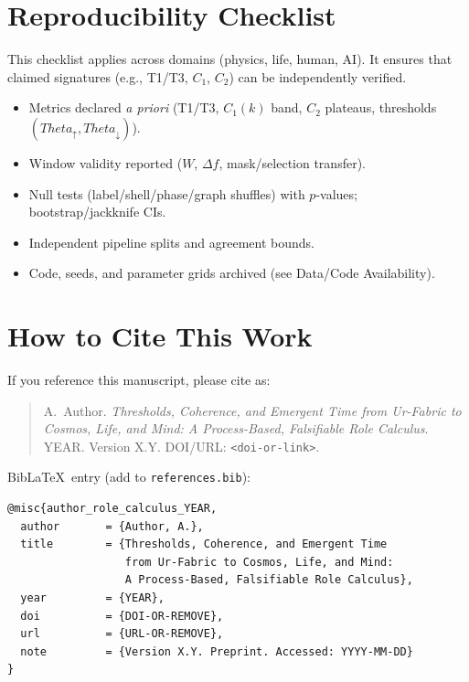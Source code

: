\documentclass[12pt,a4paper,oneside]{scrreprt}
\def\Theta{Theta}%
\begin{document}
\chapter*{Reproducibility Checklist}
This checklist applies across domains (physics, life, human, AI). 
It ensures that claimed signatures (e.g., T1/T3, $C_1$, $C_2$) can be independently verified.

\begin{itemize}
  \item Metrics declared \emph{a priori} (T1/T3, $C_1(k)$ band, $C_2$ plateaus, thresholds $(\Theta_\uparrow,\Theta_\downarrow)$).
  \item Window validity reported ($W$, $\Delta f$, mask/selection transfer).
  \item Null tests (label/shell/phase/graph shuffles) with $p$-values; bootstrap/jackknife CIs.
  \item Independent pipeline splits and agreement bounds.
  \item Code, seeds, and parameter grids archived (see Data/Code Availability).
\end{itemize}

\chapter*{How to Cite This Work}
If you reference this manuscript, please cite as:
\begin{quote}
A.~Author. \emph{Thresholds, Coherence, and Emergent Time from Ur-Fabric to Cosmos, Life, and Mind: A Process-Based, Falsifiable Role Calculus}. YEAR. 
Version X.Y. DOI/URL: \texttt{<doi-or-link>}.
\end{quote}

\noindent Bib\LaTeX\ entry (add to \texttt{references.bib}):
\begin{verbatim}
@misc{author_role_calculus_YEAR,
  author       = {Author, A.},
  title        = {Thresholds, Coherence, and Emergent Time
                  from Ur-Fabric to Cosmos, Life, and Mind:
                  A Process-Based, Falsifiable Role Calculus},
  year         = {YEAR},
  doi          = {DOI-OR-REMOVE},
  url          = {URL-OR-REMOVE},
  note         = {Version X.Y. Preprint. Accessed: YYYY-MM-DD}
}
\end{verbatim}

\nocite{author_role_calculus_arxiv}
\nocite{author_role_calculus_zenodo}
\printbibliography[heading=bibintoc,title={References}]
\end{document}
